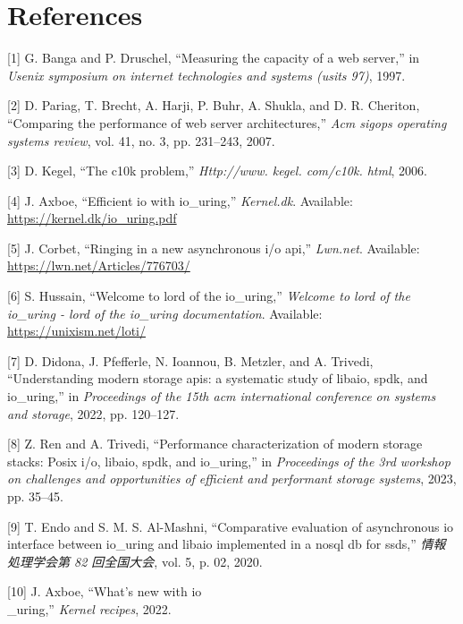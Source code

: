 \documentclass[letterpaper, 10pt, twocolumn]{article}
\begin{document}
\section{References}
\label{sec:org64a6884}
\begin{hangparas}{1.5em}{1}
\hypertarget{citeproc_bib_item_1}{[1] G. Banga and P. Druschel, “Measuring the capacity of a web server,” in \textit{Usenix symposium on internet technologies and systems (usits 97)}, 1997.}

\hypertarget{citeproc_bib_item_2}{[2] D. Pariag, T. Brecht, A. Harji, P. Buhr, A. Shukla, and D. R. Cheriton, “Comparing the performance of web server architectures,” \textit{Acm sigops operating systems review}, vol. 41, no. 3, pp. 231–243, 2007.}

\hypertarget{citeproc_bib_item_3}{[3] D. Kegel, “The c10k problem,” \textit{Http://www. kegel. com/c10k. html}, 2006.}

\hypertarget{citeproc_bib_item_4}{[4] J. Axboe, “Efficient io with io\_uring,” \textit{Kernel.dk}. Available: \url{https://kernel.dk/io_uring.pdf}}

\hypertarget{citeproc_bib_item_5}{[5] J. Corbet, “Ringing in a new asynchronous i/o api,” \textit{Lwn.net}. Available: \url{https://lwn.net/Articles/776703/}}

\hypertarget{citeproc_bib_item_6}{[6] S. Hussain, “Welcome to lord of the io\_uring,” \textit{Welcome to lord of the io\_uring - lord of the io\_uring documentation}. Available: \url{https://unixism.net/loti/}}

\hypertarget{citeproc_bib_item_7}{[7] D. Didona, J. Pfefferle, N. Ioannou, B. Metzler, and A. Trivedi, “Understanding modern storage apis: a systematic study of libaio, spdk, and io\_uring,” in \textit{Proceedings of the 15th acm international conference on systems and storage}, 2022, pp. 120–127.}

\hypertarget{citeproc_bib_item_8}{[8] Z. Ren and A. Trivedi, “Performance characterization of modern storage stacks: Posix i/o, libaio, spdk, and io\_uring,” in \textit{Proceedings of the 3rd workshop on challenges and opportunities of efficient and performant storage systems}, 2023, pp. 35–45.}

\hypertarget{citeproc_bib_item_9}{[9] T. Endo and S. M. S. Al-Mashni, “Comparative evaluation of asynchronous io interface between io\_uring and libaio implemented in a nosql db for ssds,” \textit{情報処理学会第 82 回全国大会}, vol. 5, p. 02, 2020.}

\hypertarget{citeproc_bib_item_10}{[10] J. Axboe, “What’s new with io\\_uring,” \textit{Kernel recipes}, 2022.}


\end{hangparas}
\end{document}
